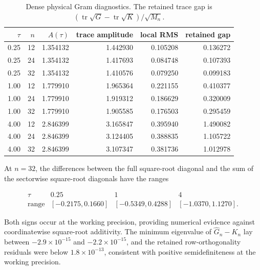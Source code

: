 \begin{table}[ht]
\centering
\caption{Dense physical Gram diagnostics.  The retained trace gap is
\((\operatorname{tr}\sqrt G-\operatorname{tr}\sqrt K)/\sqrt{M_n}\).}
\label{tab:supp-critical-diagnostics}
\begin{tabular}{rrrrrr}
\toprule
\(\tau\)&\(n\)&\(A(\tau)\)&trace amplitude&local RMS&retained gap\\
\midrule
0.25&12&1.354132&1.442930&0.105208&0.136272\\
0.25&24&1.354132&1.417693&0.084748&0.107393\\
0.25&32&1.354132&1.410576&0.079250&0.099183\\
1.00&12&1.779910&1.965364&0.221155&0.410377\\
1.00&24&1.779910&1.919312&0.186629&0.320009\\
1.00&32&1.779910&1.905585&0.176503&0.295459\\
4.00&12&2.846399&3.165847&0.395940&1.490082\\
4.00&24&2.846399&3.124405&0.388835&1.105722\\
4.00&32&2.846399&3.107347&0.381736&1.012978\\
\bottomrule
\end{tabular}
\end{table}

At \(n=32\), the differences between the full square-root diagonal and the
sum of the sectorwise square-root diagonals have the ranges

\[
\begin{array}{c|ccc}
\tau&0.25&1&4\\ \hline
\text{range}&[-0.2175,0.1660]&[-0.5349,0.4288]&[-1.0370,1.1270].
\end{array}
\]

Both signs occur at the working precision, providing numerical evidence
against coordinatewise square-root additivity. The minimum eigenvalue of
\(\widehat G_n-K_n\) lay
between \(-2.9\times10^{-15}\) and \(-2.2\times10^{-15}\), and the retained
row-orthogonality residuals were below \(1.8\times10^{-13}\), consistent with
positive semidefiniteness at the working precision.
